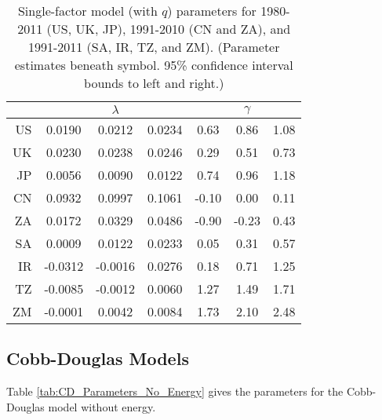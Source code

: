 \documentclass[preprint,authoryear,12pt]{elsarticle}\usepackage{graphicx, color}
\makeatletter
\newenvironment{kframe}{%
 \def\at@end@of@kframe{}%
 \ifinner\ifhmode%
  \def\at@end@of@kframe{\end{minipage}}%
  \begin{minipage}{\columnwidth}%
 \fi\fi%
 \def\FrameCommand##1{\hskip\@totalleftmargin \hskip-\fboxsep
 \colorbox{shadecolor}{##1}\hskip-\fboxsep
     \hskip-\linewidth \hskip-\@totalleftmargin \hskip\columnwidth}%
 \MakeFramed {\advance\hsize-\width
   \@totalleftmargin\z@ \linewidth\hsize
   \@setminipage}}%
 {\par\unskip\endMakeFramed%
 \at@end@of@kframe}
\makeatother
\begin{document}
\begin{table}[H]
\begin{center}
\caption{Single-factor model (with $q$) parameters for 1980-2011 (US, UK, JP), 1991-2010 (CN and ZA), and 1991-2011 (SA, IR, TZ, and ZM). (Parameter estimates beneath symbol. 95\% confidence interval bounds to left and right.)}
\label{tab:SF_Parameters_With_Q}
{\tiny
\begin{tabular}{r|ccc|ccc}
  \hline
 &   & $\lambda$ &   &   & $\gamma$ &   \\ 
  \hline
US & 0.0190 & 0.0212 & 0.0234 & 0.63 & 0.86 & 1.08 \\ 
  UK & 0.0230 & 0.0238 & 0.0246 & 0.29 & 0.51 & 0.73 \\ 
  JP & 0.0056 & 0.0090 & 0.0122 & 0.74 & 0.96 & 1.18 \\ 
  CN & 0.0932 & 0.0997 & 0.1061 & -0.10 & 0.00 & 0.11 \\ 
  ZA & 0.0172 & 0.0329 & 0.0486 & -0.90 & -0.23 & 0.43 \\ 
  SA & 0.0009 & 0.0122 & 0.0233 & 0.05 & 0.31 & 0.57 \\ 
  IR & -0.0312 & -0.0016 & 0.0276 & 0.18 & 0.71 & 1.25 \\ 
  TZ & -0.0085 & -0.0012 & 0.0060 & 1.27 & 1.49 & 1.71 \\ 
  ZM & -0.0001 & 0.0042 & 0.0084 & 1.73 & 2.10 & 2.48 \\ 
   \hline
\end{tabular}
}
\end{center}
\end{table}
\begin{kframe}

{\ttfamily\noindent\bfseries\color{errorcolor}{Error: error in evaluating the argument 'x' in selecting a method for function 'print': Error in prof\$getProfile() : \\\ \ step factor 0.000488281 reduced below 'minFactor' of 0.000976562\\Calls: singleFactorParamsTable ... confint.nls -> profile -> profile.nls -> <Anonymous>}}\end{kframe}


\subsection{Cobb-Douglas Models}

Table \ref{tab:CD_Parameters_No_Energy} gives the parameters for the Cobb-Douglas model without energy.
\end{document}
